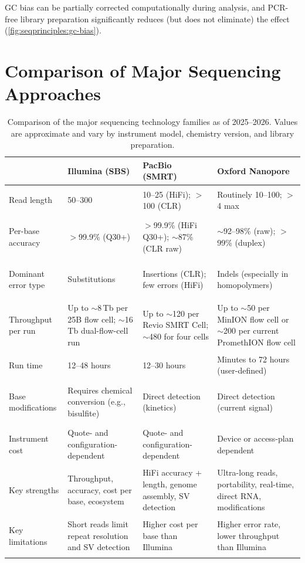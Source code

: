 GC bias can be partially corrected computationally during analysis, and PCR-free library preparation significantly reduces (but does not eliminate) the effect (\cref{fig:seqprinciples:gc-bias}).


\section{Comparison of Major Sequencing Approaches}
\label{sec:seqprinciples:comparison}

\begin{table}[htbp]
\centering
\caption[Comparison of major sequencing platforms.]{Comparison of the major sequencing technology families as of 2025--2026. Values are approximate and vary by instrument model, chemistry version, and library preparation.}
\label{tab:seqprinciples:platform-comparison}
\small
\begin{tabularx}{\textwidth}{>{\bfseries\raggedright}p{2.8cm} X X X}
\toprule
& \textbf{Illumina (SBS)} & \textbf{PacBio (SMRT)} & \textbf{Oxford Nanopore} \\
\midrule
Read length & 50--300\basepair{} & 10--25\kilobase{} (HiFi); $>$100\kilobase{} (CLR) & Routinely 10--100\kilobase{}; $>$4\megabase{} max \\
\addlinespace
Per-base accuracy & $>$99.9\% (Q30+) & $>$99.9\% (HiFi Q30+); $\sim$87\% (CLR raw) & $\sim$92--98\% (raw); $>$99\% (duplex) \\
\addlinespace
Dominant error type & Substitutions & Insertions (CLR); few errors (HiFi) & Indels (especially in homopolymers) \\
\addlinespace
Throughput per run & Up to $\sim$8\,Tb per 25B flow cell; $\sim$16\,Tb dual-flow-cell run & Up to $\sim$120\gigabase{} per Revio SMRT Cell; $\sim$480\gigabase{} for four cells & Up to $\sim$50\gigabase{} per MinION flow cell or $\sim$200\gigabase{} per current PromethION flow cell \\
\addlinespace
Run time & 12--48 hours & 12--30 hours & Minutes to 72 hours (user-defined) \\
\addlinespace
Base modifications & Requires chemical conversion (e.g., bisulfite) & Direct detection (kinetics) & Direct detection (current signal) \\
\addlinespace
Instrument cost & Quote- and configuration-dependent & Quote- and configuration-dependent & Device or access-plan dependent \\
\addlinespace
Key strengths & Throughput, accuracy, cost per base, ecosystem & HiFi accuracy + length, genome assembly, SV detection & Ultra-long reads, portability, real-time, direct RNA, modifications \\
\addlinespace
Key limitations & Short reads limit repeat resolution and SV detection & Higher cost per base than Illumina & Higher error rate, lower throughput than Illumina \\
\bottomrule
\end{tabularx}
\end{table}

